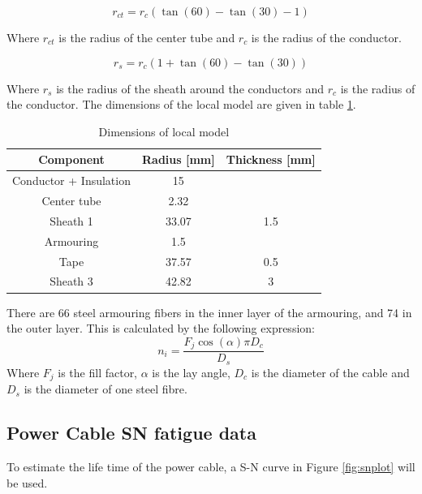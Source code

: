   \begin{equation}
   r_{ct} = r_c (\tan(60)-\tan(30)-1)
\end{equation}

 \noindent Where $r_{ct}$ is the radius of the center tube and $r_c$ is the radius of the conductor.

 \begin{equation}
   r_{s} = r_c (1+\tan(60)-\tan(30))
\end{equation}
 
  \noindent Where $r_{s}$ is the radius of the sheath around the conductors and $r_c$ is the radius of the conductor. \newline
  \newline 
  \noindent The dimensions of the local model are given in table \ref{table:dim}. 


\begin{table} [H]
\centering
\begin{tabular}{ |c|c|c|}
\hline
Component & Radius [mm] & Thickness [mm] \\
 \hline
 \hline
 Conductor + Insulation & 15 &\\

 Center tube & 2.32& \\
 
 Sheath 1 & 33.07 & 1.5 \\
 
Armouring & 1.5 &  \\

Tape & 37.57 & 0.5 \\

Sheath 3 & 42.82& 3  \\

 \hline
\end{tabular}
\caption{Dimensions of local model}
\label{table:dim}
\end{table} 

\noindent There are 66 steel armouring fibers in the inner layer of the armouring, and 74 in the outer layer. This is calculated by the following expression:
\begin{equation}
    n_i=\frac{F_j\cos(\alpha)\pi D_c}{D_s}
\end{equation}
Where $F_j$ is the fill factor, $\alpha$ is the lay angle, $D_c$ is the diameter of the cable and $D_s$ is the diameter of one steel fibre. 
\subsection{Power Cable SN fatigue data}
To estimate the life time of the power cable, a S-N curve in Figure \ref{fig:snplot} will be used. 

